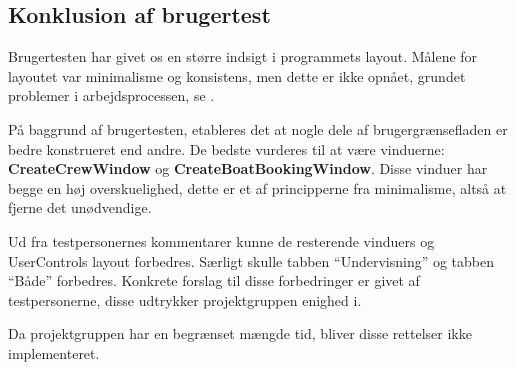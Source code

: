 \subsection{Konklusion af brugertest}
Brugertesten har givet os en større indsigt i programmets layout.
Målene for layoutet var minimalisme og konsistens, men dette er ikke opnået, grundet problemer i arbejdsprocessen, se . 

På baggrund af brugertesten, etableres det at nogle dele af brugergrænsefladen er bedre konstrueret end andre.
De bedste vurderes til at være vinduerne: \textbf{CreateCrewWindow} og \textbf{CreateBoatBookingWindow}. 
Disse vinduer har begge en høj overskuelighed, dette er et af principperne fra minimalisme, altså at fjerne det unødvendige. 

Ud fra testpersonernes kommentarer kunne de resterende vinduers og UserControls layout forbedres. 
Særligt skulle tabben ``Undervisning'' og tabben ``Både'' forbedres.
Konkrete forslag til disse forbedringer er givet af testpersonerne, disse udtrykker projektgruppen enighed i. 

Da projektgruppen har en begrænset mængde tid, bliver disse rettelser ikke implementeret. 
